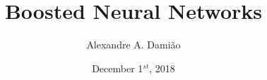 \title{\textbf{Boosted Neural Networks}\\}
\author{Alexandre A. Dami\~ao}
\date{December 1$^{st}$, 2018}

\maketitle
\thispagestyle{empty}
{}